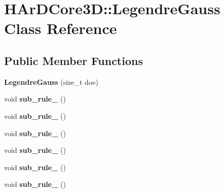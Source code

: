 \hypertarget{classHArDCore3D_1_1LegendreGauss}{}\section{H\+Ar\+D\+Core3D\+:\+:Legendre\+Gauss Class Reference}
\label{classHArDCore3D_1_1LegendreGauss}
\subsection*{Public Member Functions}
\begin{DoxyCompactItemize}
\item 
\mbox{\label{classHArDCore3D_1_1LegendreGauss_a4df4c78f50b0116cb68151073a45e08a}} 
{\bfseries Legendre\+Gauss} (size\+\_\+t doe)
\item 
\mbox{\label{classHArDCore3D_1_1LegendreGauss_aa60072df54f7acc9bad7362e4d6f6f72}} 
void {\bfseries sub\+\_\+rule\+\_} ()
\item 
\mbox{\label{classHArDCore3D_1_1LegendreGauss_a3b20f2cc13f96879fe731e3411e118cf}} 
void {\bfseries sub\+\_\+rule\+\_} ()
\item 
\mbox{\label{classHArDCore3D_1_1LegendreGauss_a0ee58d8688bfaaa7952cd7f70e06ad05}} 
void {\bfseries sub\+\_\+rule\+\_} ()
\item 
\mbox{\label{classHArDCore3D_1_1LegendreGauss_a55751cb4eed2cd44b12fe7bcc505097a}} 
void {\bfseries sub\+\_\+rule\+\_} ()
\item 
\mbox{\label{classHArDCore3D_1_1LegendreGauss_aa4e7cbaed5cea19a7490501e67bf728b}} 
void {\bfseries sub\+\_\+rule\+\_} ()
\item 
\mbox{\label{classHArDCore3D_1_1LegendreGauss_aff68078ed4cdc77372609b56c3fcfc2a}} 
void {\bfseries sub\+\_\+rule\+\_} ()
\item 
\mbox{\label{classHArDCore3D_1_1LegendreGauss_a70452a921cb1f1eb6e30d7436102ae01}} 

\end{DoxyCompactItemize}
